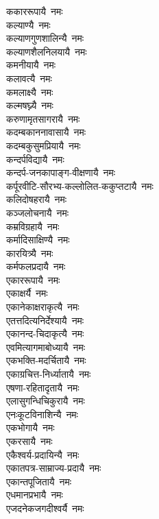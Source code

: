 \begin{multicols}{2}
\begin{flushleft}
ककाररूपायै~नमः\\
कल्याण्यै~नमः\\
कल्याणगुणशालिन्यै~नमः\\
कल्याणशैलनिलयायै~नमः\\
कमनीयायै~नमः\\
कलावत्यै~नमः\\
कमलाक्ष्यै~नमः\\
कल्मषघ्न्यै~नमः\\
करुणामृतसागरायै~नमः\\
कदम्बकाननावासायै~नमः\hfill {}\\
कदम्बकुसुमप्रियायै~नमः\\
कन्दर्पविद्यायै~नमः\\
कन्दर्प-जनकापाङ्ग-वीक्षणायै~नमः\\
कर्पूरवीटि-सौरभ्य-कल्लोलित-ककुप्तटायै~नमः\\
कलिदोषहरायै~नमः\\
कञ्जलोचनायै~नमः\\
कम्रविग्रहायै~नमः\\
कर्मादिसाक्षिण्यै~नमः\\
कारयित्र्यै~नमः\\
कर्मफलप्रदायै~नमः\hfill {}\\
एकाररूपायै~नमः\\
एकाक्षर्यै~नमः\\
एकानेकाक्षराकृत्यै~नमः\\
एतत्तदित्यनिर्देश्यायै~नमः\\
एकानन्द-चिदाकृत्यै~नमः\\
एवमित्यागमाबोध्यायै~नमः\\
एकभक्ति-मदर्चितायै~नमः\\
एकाग्रचित्त-निर्ध्यातायै~नमः\\
एषणा-रहितादृतायै~नमः\\
एलासुगन्धिचिकुरायै~नमः\hfill {}\\
एनःकूटविनाशिन्यै~नमः\\
एकभोगायै~नमः\\
एकरसायै~नमः\\
एकैश्वर्य-प्रदायिन्यै~नमः\\
एकातपत्र-साम्राज्य-प्रदायै~नमः\\
एकान्तपूजितायै~नमः\\
एधमानप्रभायै~नमः\\
एजदनेकजगदीश्वर्यै~नमः\\

\end{flushleft}
\end{multicols}
